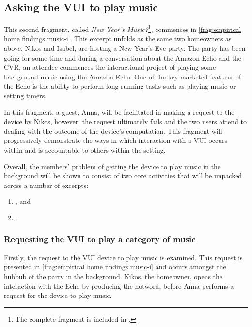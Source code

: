 \subsection{Asking the VUI to play music}\label{sec:empirical home findings music}
\begin{revisedsubmission}
This second fragment, called \textit{New Year's Music?}\footnote{The complete fragment is included in .}, commences in \autoref{frag:empirical home findings music-i}.
This excerpt unfolds as the same two homeowners as above, Nikos and Isabel, are hosting a New Year's Eve party.
The party has been going for some time and during a conversation about the Amazon Echo and the \ac{CVR}, an attendee commences the interactional project of playing some background music using the Amazon Echo.
One of the key marketed features of the Echo is the ability to perform long-running tasks such as playing music or setting timers.

In this fragment, a guest, Anna, will be facilitated in making a request to the device by Nikos, however, the request ultimately fails and the two users attend to dealing with the outcome of the device's computation.
This fragment will progressively demonstrate the ways in which interaction with a \ac{VUI} occurs within and is accountable to others within the setting.

Overall, the members' problem of getting the device to play music in the background will be shown to consist of two core activities that will be unpacked across a number of excerpts:
\end{revisedsubmission}
\begin{enumerate}[label=(\roman*)]
\item {}, and
\item {}.
\end{enumerate}






\subsubsection{Requesting the VUI to play a category of music}\label{sec:empirical home findings music requesting}
\begin{revisedsubmission}
Firstly, the request to the \ac{VUI} device to play music is examined.
This request is presented in \autoref{frag:empirical home findings music-i} and occurs amongst the hubbub of the party in the background.
Nikos, the homeowner, opens the interaction with the Echo by producing the hotword, before Anna performs a request for the device to play music.
\end{revisedsubmission}

